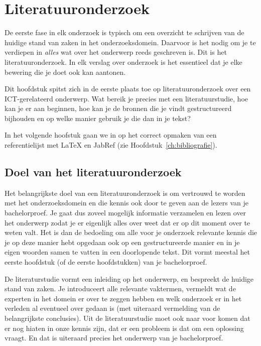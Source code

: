 \chapter{Literatuuronderzoek}%
\label{ch:literatuuronderzoek}

De eerste fase in elk onderzoek is typisch om een overzicht te schrijven van de huidige stand van zaken in het onderzoeksdomein. Daarvoor is het nodig om je te verdiepen in \emph{alles} wat over het onderwerp reeds geschreven is. Dit is het literatuuronderzoek. In elk verslag over onderzoek is het essentieel dat je elke bewering die je doet ook kan aantonen.

Dit hoofdstuk spitst zich in de eerste plaats toe op literatuuronderzoek over een ICT-gerelateerd onderwerp. Wat bereik je precies met een literatuurstudie, hoe kan je er aan beginnen, hoe kan je de bronnen die je vindt gestructureerd bijhouden en op welke manier gebruik je die dan in je tekst? 

In het volgende hoofstuk gaan we in op het correct opmaken van een referentielijst met {\LaTeX} en JabRef (zie Hoofdstuk~\ref{ch:bibliografie}).

\section{Doel van het literatuuronderzoek}%
\label{sec:doel-literatuuronderzoek}

Het belangrijkste doel van een literatuuronderzoek is om vertrouwd te worden met het onderzoeksdomein en die kennis ook door te geven aan de lezers van je bachelorproef. Je gaat dus zoveel mogelijk informatie verzamelen en lezen over het onderwerp zodat je er eigenlijk alles over weet dat er op dit moment over te weten valt. Het is dan de bedoeling om alle voor je onderzoek relevante kennis die je op deze manier hebt opgedaan ook op een gestructureerde manier en in je eigen woorden samen te vatten in een doorlopende tekst. Dit vormt meestal het eerste hoofdstuk (of de eerste hoofdstukken) van je bachelorproef.

De literaturstudie vormt een inleiding op het onderwerp, en bespreekt de huidige stand van zaken. Je introduceert alle relevante vaktermen, vermeldt wat de experten in het domein er over te zeggen hebben en welk onderzoek er in het verleden al eventueel over gedaan is (met uiteraard vermelding van de belangrijkste conclusies). Uit de literatuurstudie moet ook naar voor komen dat er nog hiaten in onze kennis zijn, dat er een probleem is dat om een oplossing vraagt. En dat is uiteraard precies het onderwerp van je bachelorproef.

